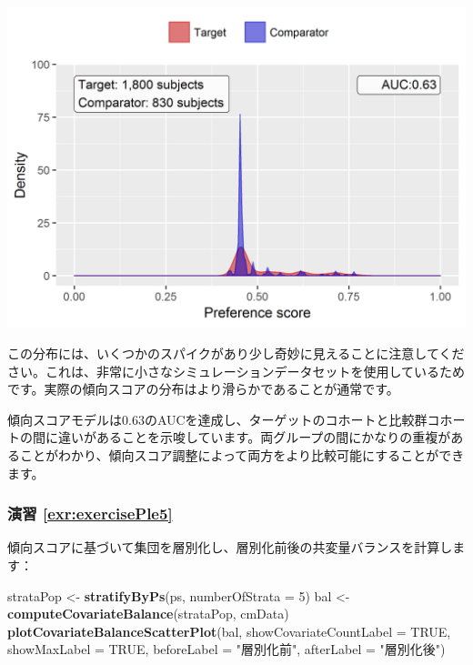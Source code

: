 \documentclass[
  11pt]{book}
\newenvironment{Shaded}{\begin{snugshade}}{\end{snugshade}}
\newcommand{\AttributeTok}[1]{\textcolor[rgb]{0.13,0.29,0.53}{#1}}
\newcommand{\ConstantTok}[1]{\textcolor[rgb]{0.56,0.35,0.01}{#1}}
\newcommand{\DecValTok}[1]{\textcolor[rgb]{0.00,0.00,0.81}{#1}}
\newcommand{\FunctionTok}[1]{\textcolor[rgb]{0.13,0.29,0.53}{\textbf{#1}}}
\newcommand{\NormalTok}[1]{#1}
\newcommand{\OtherTok}[1]{\textcolor[rgb]{0.56,0.35,0.01}{#1}}
\newcommand{\StringTok}[1]{\textcolor[rgb]{0.31,0.60,0.02}{#1}}
\theoremstyle{definition}
\theoremstyle{definition}
\theoremstyle{definition}
\theoremstyle{definition}
\theoremstyle{remark}
\begin{document}
\begin{center}\includegraphics[width=0.8\linewidth]{images/SuggestedAnswers/ps} \end{center}

この分布には、いくつかのスパイクがあり少し奇妙に見えることに注意してください。これは、非常に小さなシミュレーションデータセットを使用しているためです。実際の傾向スコアの分布はより滑らかであることが通常です。

傾向スコアモデルは0.63のAUCを達成し、ターゲットのコホートと比較群コホートの間に違いがあることを示唆しています。両グループの間にかなりの重複があることがわかり、傾向スコア調整によって両方をより比較可能にすることができます。

\subsubsection*{演習 \ref{exr:exercisePle5}}\label{ux6f14ux7fd2-refexrexerciseple5}

傾向スコアに基づいて集団を層別化し、層別化前後の共変量バランスを計算します：

\begin{Shaded}
\begin{Highlighting}[]
\NormalTok{strataPop }\OtherTok{\textless{}{-}} \FunctionTok{stratifyByPs}\NormalTok{(ps, }\AttributeTok{numberOfStrata =} \DecValTok{5}\NormalTok{)}
\NormalTok{bal }\OtherTok{\textless{}{-}} \FunctionTok{computeCovariateBalance}\NormalTok{(strataPop, cmData)}
\FunctionTok{plotCovariateBalanceScatterPlot}\NormalTok{(bal,}
                                \AttributeTok{showCovariateCountLabel =} \ConstantTok{TRUE}\NormalTok{,}
                                \AttributeTok{showMaxLabel =} \ConstantTok{TRUE}\NormalTok{,}
                                \AttributeTok{beforeLabel =} \StringTok{"層別化前"}\NormalTok{,}
                                \AttributeTok{afterLabel =} \StringTok{"層別化後"}\NormalTok{)}
\end{Highlighting}
\end{Shaded}
\end{document}
